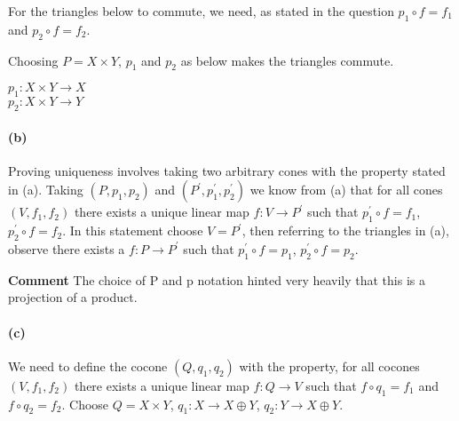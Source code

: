 \documentclass{article}
\begin{document}
For the triangles below to commute, we need, as stated in the question $p_1 \circ f = f_1$ and $p_2 \circ f = f_2$.\\
\begin{center}

 \break\hfill

\end{center}
Choosing $P=X\times{Y}$, $p_1$ and $p_2$ as below makes the triangles commute.
\begin{center}
$p_1\colon X\times{Y} \rightarrow X$ \\
$p_2\colon X\times{Y} \rightarrow Y$
\end{center}

\paragraph{(b)}

Proving uniqueness involves taking two arbitrary cones with the property stated in (a).
Taking $(P, p_1, p_2)$ and $(P^\prime, p_1^\prime, p_2^\prime)$
we know from (a) that for all cones $(V, f_1, f_2)$ there exists a unique linear map $f\colon V \rightarrow P^\prime$ such that $p_1^\prime \circ f = f_1$, $p_2^\prime \circ f = f_2$.
In this statement choose $V=P^\prime$, then referring to the triangles in (a), observe there exists a $f\colon P \rightarrow P^\prime$ such that $p_1^\prime \circ f = p_1$, $p_2^\prime \circ f = p_2$.

\textbf{Comment} The choice of P and p notation hinted very heavily that this is a projection of a product.

\paragraph{(c)}

We need to define the cocone $(Q, q_1, q_2)$ with the property, for all cocones $(V, f_1, f_2)$ there exists a unique linear map $f\colon Q \rightarrow V$ such that $f \circ q_1 = f_1$ and $f \circ q_2 = f_2$. Choose $Q= X \times Y$, $q_1\colon X \rightarrow X \oplus Y$, $q_2\colon Y \rightarrow X \oplus Y$. \\
\end{document}
